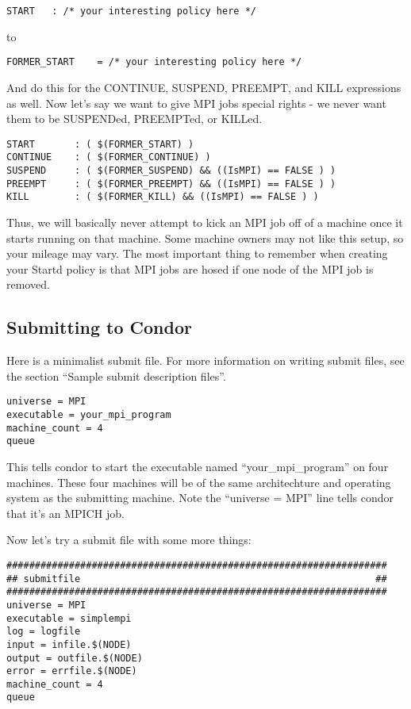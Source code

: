 \begin{verbatim}
START	: /* your interesting policy here */
\end{verbatim}

to 

\begin{verbatim}
FORMER_START	= /* your interesting policy here */
\end{verbatim}

And do this for the CONTINUE, SUSPEND, PREEMPT, and KILL expressions 
as well.  Now let's say we want to give MPI jobs special rights - we 
never want them to be SUSPENDed, PREEMPTed, or KILLed.  

\begin{verbatim}
START		: ( $(FORMER_START) )
CONTINUE	: ( $(FORMER_CONTINUE) )
SUSPEND		: ( $(FORMER_SUSPEND) && ((IsMPI) == FALSE ) )
PREEMPT		: ( $(FORMER_PREEMPT) && ((IsMPI) == FALSE ) )
KILL		: ( $(FORMER_KILL) && ((IsMPI) == FALSE ) )
\end{verbatim}

Thus, we will basically never attempt to kick an MPI job off of 
a machine once it starts running on that machine.  Some machine
owners may not like this setup, so your mileage may vary.  The most
important thing to remember when creating your Startd policy is that
MPI jobs are hosed if one node of the MPI job is removed.

\subsection{\label{sec:MPI-submit}Submitting to Condor}

Here is a minimalist submit file.  For more information on writing
submit files, see the section ``Sample submit description files''.

\begin{verbatim}
universe = MPI
executable = your_mpi_program
machine_count = 4
queue 
\end{verbatim}

This tells condor to start the executable named ``your\_mpi\_program'' 
on four machines.  These four machines will be of the same architechture
and operating system as the submitting machine.  Note the 
``universe = MPI'' line tells condor that it's an MPICH job.  

Now let's try a submit file with some more things:

\begin{verbatim}
###################################################################
## submitfile                                                    ##
###################################################################
universe = MPI
executable = simplempi
log = logfile
input = infile.$(NODE)
output = outfile.$(NODE)
error = errfile.$(NODE)
machine_count = 4
queue
\end{verbatim}

